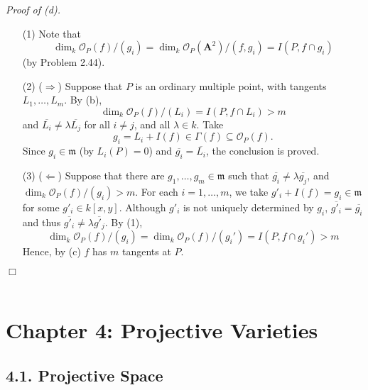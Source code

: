 \documentclass{article}
\begin{document}
\emph{Proof of (d).}
\begin{enumerate}
\item[(1)]
  Note that
  \[
    \dim_k \mathscr{O}_P(f)/(g_i)
    = \dim_k \mathscr{O}_P(\mathbf{A}^2)/(f, g_i)
    = I(P, f \cap g_i)
  \]
  (by Problem 2.44).

\item[(2)]
  ($\Longrightarrow$)
  Suppose that $P$ is an ordinary multiple point, with tangents $L_1, \ldots, L_m$.
  By (b),
  \[
    \dim_k \mathscr{O}_P(f)/(L_i) = I(P, f \cap L_i) > m
  \]
  and
  $\overline{L_i} \neq \lambda \overline{L_j}$ for all $i \neq j$, and all $\lambda \in k$.
  Take
  \[
    g_i = L_i + I(f) \in \Gamma(f) \subseteq \mathscr{O}_P(f).
  \]
  Since $g_i \in \mathfrak{m}$ (by $L_i(P) = 0$) and $\overline{g_i} = \overline{L_i}$,
  the conclusion is proved.

\item[(3)]
  ($\Longleftarrow$)
  Suppose that there are $g_1, \ldots, g_m \in \mathfrak{m}$ such that
  $\overline{g_i} \neq \lambda \overline{g_j}$,
  and $\dim_k \mathscr{O}_P(f)/(g_i) > m$.
  For each $i = 1, \ldots, m$,
  we take $g'_i + I(f) = g_i \in \mathfrak{m}$ for some $g'_i \in k[x,y]$.
  Although $g'_i$ is not uniquely determined by $g_i$,
  $\overline{g'_i} = \overline{g_i}$ and thus $\overline{g'_i} \neq \lambda \overline{g'_j}$.
  By (1),
  \[
    \dim_k \mathscr{O}_P(f)/(g_i)
    = \dim_k \mathscr{O}_P(f)/(g_i')
    = I(P, f \cap g_i') > m
  \]
  Hence, by (c) $f$ has $m$ tangents at $P$.
\end{enumerate}
$\Box$ \\\\






\newpage
\section*{Chapter 4: Projective Varieties \\}



\subsection*{4.1. Projective Space \\}
\end{document}
